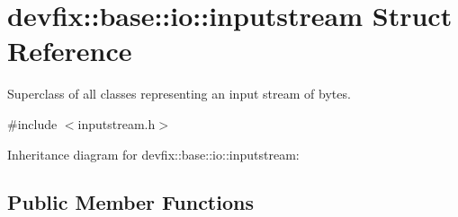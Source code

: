 \hypertarget{structdevfix_1_1base_1_1io_1_1inputstream}{}\section{devfix\+:\+:base\+:\+:io\+:\+:inputstream Struct Reference}
\label{structdevfix_1_1base_1_1io_1_1inputstream}


Superclass of all classes representing an input stream of bytes.  




{\ttfamily \#include $<$inputstream.\+h$>$}



Inheritance diagram for devfix\+:\+:base\+:\+:io\+:\+:inputstream\+:
\subsection*{Public Member Functions}
